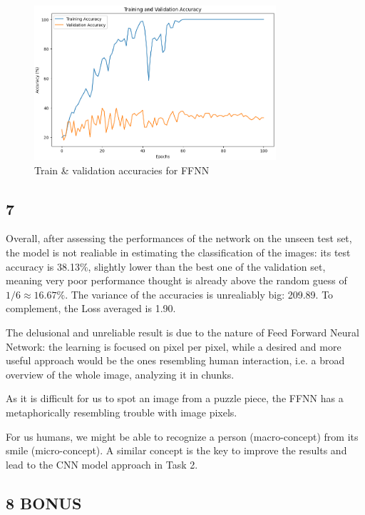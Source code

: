 \documentclass[11pt]{scrartcl}
\begin{document}
\begin{figure}[htbp]
\centering
\includegraphics[width=0.8\textwidth]{./figures/task1-accuracy.png}
\caption{Train \& validation accuracies for FFNN}
\label{fig:task1-accuracy}
\end{figure}

\subsection*{7}

Overall, after assessing the performances of the network on the unseen test set,
the model is not realiable in estimating the classification of the images: 
its test accuracy is 38.13\%, slightly lower than the best one of the validation set,
meaning very poor performance thought is already above the random guess of
\( 1/6 \approx 16.67\% \).
The variance of the accuracies is unrealiably big: 209.89.
To complement, the Loss averaged is 1.90. 

The delusional and unreliable result is due to the nature of Feed Forward Neural Network:
the learning is focused on pixel per pixel,
while a desired and more useful approach would be the ones resembling human interaction,
i.e. a broad overview of the whole image,
analyzing it in chunks.

As it is difficult for us to spot an image from a puzzle piece,
the FFNN has a metaphorically resembling trouble with image pixels.

For us humans, we might be able to recognize a person (macro-concept) 
from its smile (micro-concept).
A similar concept is the key to improve the results 
and lead to the CNN model approach in Task 2.


\subsection*{8 BONUS}
\end{document}
